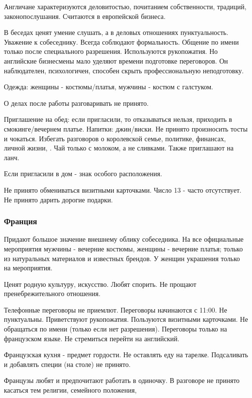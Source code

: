 Англичане характеризуются деловитостью, почитанием собственности, традиций, законопослушания. Считаются \missed{} в европейской \missed{} бизнеса.

В беседах ценят умение слушать, а в деловых отношениях пунктуальность. Уважение к собеседнику. Всегда соблюдают формальность. Общение по имени только после специального разрешения. Используются рукопожатия. Но английские бизнесмены мало уделяют времени подготовке переговоров. Он наблюдателен, психологичен, способен скрыть профессиональную неподготовку.

Одежда: женщины - костюмы/платья, мужчины - костюм с галстуком.

О делах после работы разговаривать не принято.

Приглашение на обед: если пригласили, то отказываться нельзя, приходить в смокинге/вечернем платье. Напитки: джин/виски. Не принято произносить тосты и чокаться.
Избегать разговоров о королевской семье, политике, финансах, личной жизни, \missed{}.
Чай только с молоком, а не сливками.
Также приглашают на ланч.

Если пригласили в дом - знак особого расположения.

Не принято обмениваться визитными карточками. Число 13 - часто отсутствует. Не принято дарить дорогие подарки.

\subsubsection{Франция}

Придают большое значение внешнему облику собеседника. На все официальные мероприятия мужчины - вечерние костюмы, женщины - вечерние платья; только из натуральных материалов и известных брендов. У женщин украшения только на мероприятия.

Ценят родную культуру, искусство.
Любят спорить. Не прощают пренебрежительного отношения.

Телефонные переговоры не приемлют. Переговоры начинаются с 11:00. Не пунктуальны. Приветствуют рукопожатия. Пользуются визитными карточками.
Не обращаться по имени (только если нет разрешения). Переговоры только на французском языке.
Не стремиться перейти на английский.

Французская кухня - предмет гордости. Не оставлять еду на тарелке. Подсаливать и добавлять специи (на столе) не принято.

Французы любят и предпочитают работать в одиночку. В разговоре не принято касаться тем религии, семейного положения, \missed{}

